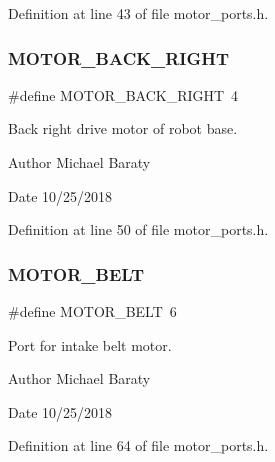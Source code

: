 Definition at line 43 of file motor\+\_\+ports.\+h.

\mbox{\label{motor__ports_8h_ad85c5f3d6a2d00789c8c67b960c46c2b}} 
\subsubsection{M\+O\+T\+O\+R\+\_\+\+B\+A\+C\+K\+\_\+\+R\+I\+G\+HT}
{\footnotesize\ttfamily \#define M\+O\+T\+O\+R\+\_\+\+B\+A\+C\+K\+\_\+\+R\+I\+G\+HT~4}



Back right drive motor of robot base. 

\begin{DoxyAuthor}{Author}
Michael Baraty 
\end{DoxyAuthor}
\begin{DoxyDate}{Date}
10/25/2018 
\end{DoxyDate}


Definition at line 50 of file motor\+\_\+ports.\+h.

\mbox{\label{motor__ports_8h_a0ab0a7d34dc7a35a82eeac0c6746ac63}} 
\subsubsection{M\+O\+T\+O\+R\+\_\+\+B\+E\+LT}
{\footnotesize\ttfamily \#define M\+O\+T\+O\+R\+\_\+\+B\+E\+LT~6}



Port for intake belt motor. 

\begin{DoxyAuthor}{Author}
Michael Baraty 
\end{DoxyAuthor}
\begin{DoxyDate}{Date}
10/25/2018 
\end{DoxyDate}


Definition at line 64 of file motor\+\_\+ports.\+h.

\mbox{\label{motor__ports_8h_a403dc780867333fdcfcae4be6a0f5cce}} 
